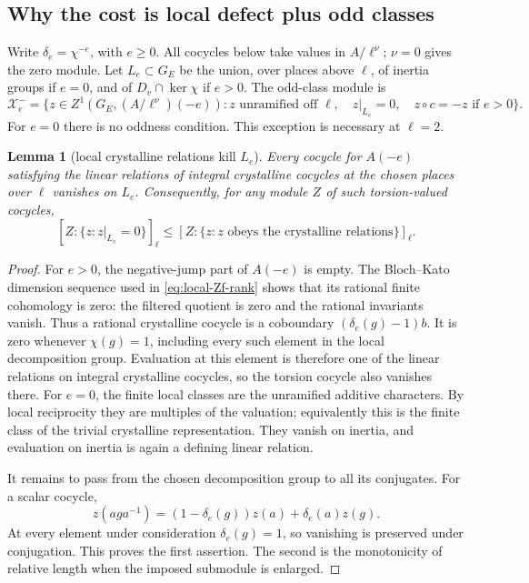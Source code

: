 \documentclass[11pt,a4paper]{article}
\newtheorem{lemma}[theorem]{Lemma}
\theoremstyle{definition}
\begin{document}
\subsection{Why the cost is local defect plus odd classes}
\label{sec:tate-character-cost}
Write \(\delta_e=\chi^{-e}\), with \(e\ge0\).
All cocycles below take values in \(A/\ell^\nu\);
\(\nu=0\) gives the zero module.
Let \(L_e\subset G_E\) be the union, over places
above \(\ell\), of inertia groups if \(e=0\),
and of
\(D_v\cap\ker\chi\) if \(e>0\).
The odd-class module is
\[
 \mathcal X_e^-=
 \{z\in Z^1(G_E,(A/\ell^\nu)(-e)):
       z\text{ unramified off }\ell,\quad z|_{L_e}=0,
       \quad z\circ c=-z\text{ if }e>0\}.
\]
For \(e=0\) there is no oddness condition.
This exception is necessary at \(\ell=2\).

\begin{lemma}[local crystalline relations kill \(L_e\)]
\label{lem:tate-local-vanishing}
Every cocycle for \(A(-e)\) satisfying the linear
relations of integral crystalline cocycles at
the chosen places over \(\ell\) vanishes on \(L_e\).
Consequently, for any module \(Z\) of such
torsion-valued cocycles,
\[
 [Z:\{z:z|_{L_e}=0\}]_\ell
   \le [Z:\{z:z\text{ obeys the crystalline relations}\}]_\ell .
\]
\end{lemma}
\begin{proof}
For \(e>0\), the negative-jump part of \(A(-e)\)
is empty. The Bloch--Kato dimension sequence used
in \eqref{eq:local-Zf-rank} shows that its rational
finite cohomology is zero: the filtered quotient
is zero and the rational invariants vanish.
Thus a rational crystalline cocycle is a
coboundary \((\delta_e(g)-1)b\).
It is zero whenever \(\chi(g)=1\), including
every such element in the local decomposition
group. Evaluation at this element is therefore
one of the linear relations on integral
crystalline cocycles, so the torsion cocycle
also vanishes there.
For \(e=0\), the finite local classes are the
unramified additive characters. By local
reciprocity they are multiples of the valuation;
equivalently this is the finite class of the
trivial crystalline representation. They
vanish on inertia, and evaluation on inertia
is again a defining linear relation.

It remains to pass from the chosen decomposition
group to all its conjugates. For a scalar cocycle,
\[
 z(aga^{-1})=(1-\delta_e(g))z(a)+\delta_e(a)z(g).
\]
At every element under consideration
\(\delta_e(g)=1\), so vanishing is preserved
under conjugation. This proves the first
assertion. The second is the monotonicity of
relative length when the imposed submodule
is enlarged.
\end{proof}
\end{document}
